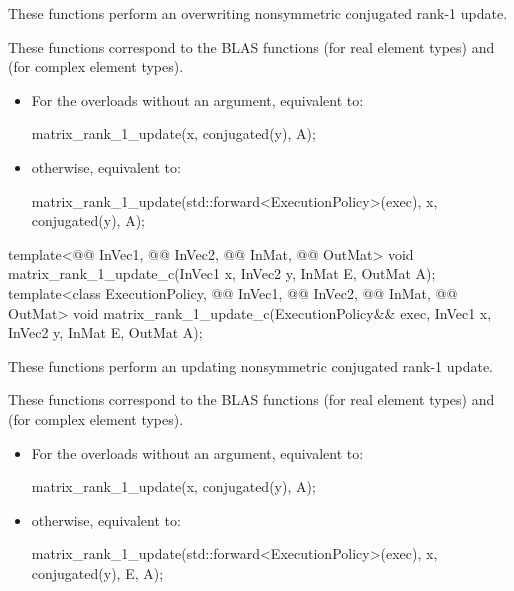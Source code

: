 \begin{itemdescr}
\pnum
These functions perform an overwriting nonsymmetric conjugated rank-1 update.
\begin{note}
These functions correspond to the BLAS functions
 (for real element types) and
 (for complex element types)\supercite{blas2}.
\end{note}

\pnum
\effects
\begin{itemize}
\item
For the overloads without an  argument,
equivalent to:
\begin{codeblock}
matrix_rank_1_update(x, conjugated(y), A);
\end{codeblock}
\item
otherwise, equivalent to:
\begin{codeblock}
matrix_rank_1_update(std::forward<ExecutionPolicy>(exec), x, conjugated(y), A);
\end{codeblock}
\end{itemize}
\end{itemdescr}

%
\begin{itemdecl}
template<@@ InVec1, @@ InVec2, @@ InMat, @@ OutMat>
  void matrix_rank_1_update_c(InVec1 x, InVec2 y, InMat E, OutMat A);
template<class ExecutionPolicy, @@ InVec1, @@ InVec2, @@ InMat,
         @@ OutMat>
  void matrix_rank_1_update_c(ExecutionPolicy&& exec, InVec1 x, InVec2 y, InMat E, OutMat A);
\end{itemdecl}

\begin{itemdescr}
\pnum
These functions perform an updating nonsymmetric conjugated rank-1 update.
\begin{note}
These functions correspond to the BLAS functions
 (for real element types) and
 (for complex element types)\supercite{blas2}.
\end{note}

\pnum
\effects
\begin{itemize}
\item
For the overloads without an  argument,
equivalent to:
\begin{codeblock}
matrix_rank_1_update(x, conjugated(y), A);
\end{codeblock}
\item
otherwise, equivalent to:
\begin{codeblock}
matrix_rank_1_update(std::forward<ExecutionPolicy>(exec), x, conjugated(y), E, A);
\end{codeblock}
\end{itemize}
\end{itemdescr}

